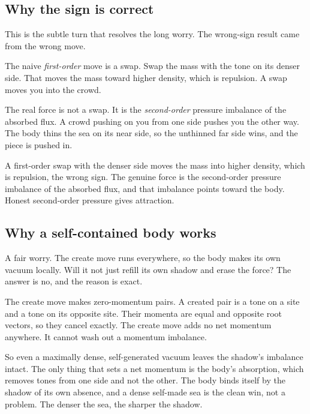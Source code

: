 \subsection{Why the sign is correct}

This is the subtle turn that resolves the long worry. The wrong-sign result came from the wrong move.

The naive \emph{first-order} move is a swap. Swap the mass with the tone on its denser side. That moves the mass toward higher density, which is repulsion. A swap moves you into the crowd.

The real force is not a swap. It is the \emph{second-order} pressure imbalance of the absorbed flux. A crowd pushing on you from one side pushes you the other way. The body thins the sea on its near side, so the unthinned far side wins, and the piece is pushed in.

\begin{proposition}
A first-order swap with the denser side moves the mass into higher density, which is repulsion, the wrong sign. The genuine force is the second-order pressure imbalance of the absorbed flux, and that imbalance points toward the body. Honest second-order pressure gives attraction.
\end{proposition}

\subsection{Why a self-contained body works}

A fair worry. The create move runs everywhere, so the body makes its own vacuum locally. Will it not just refill its own shadow and erase the force? The answer is no, and the reason is exact.

\begin{principle}
The create move makes zero-momentum pairs. A created pair is a tone on a site and a tone on its opposite site. Their momenta are equal and opposite root vectors, so they cancel exactly. The create move adds no net momentum anywhere. It cannot wash out a momentum imbalance.
\end{principle}

So even a maximally dense, self-generated vacuum leaves the shadow's imbalance intact. The only thing that sets a net momentum is the body's absorption, which removes tones from one side and not the other. The body binds itself by the shadow of its own absence, and a dense self-made sea is the clean win, not a problem. The denser the sea, the sharper the shadow.

